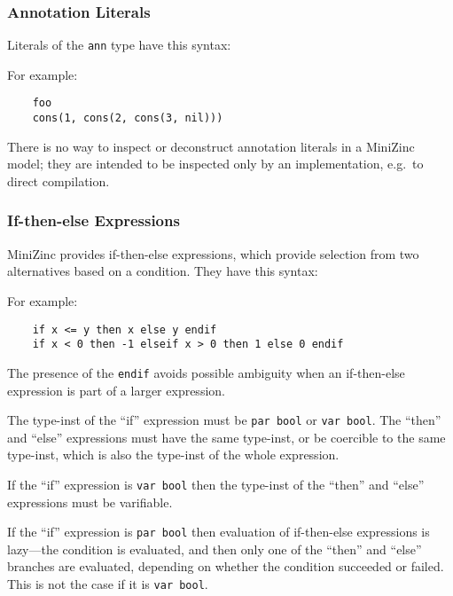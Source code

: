 \documentclass[10pt]{scrartcl}
\begin{document}
\subsubsection{Annotation Literals}
Literals of the \texttt{ann} type have this syntax:
\begin{productions}
    \RuleAnnLiteral
\end{productions}
For example:
\begin{verbatim}
    foo
    cons(1, cons(2, cons(3, nil)))
\end{verbatim}

There is no way to inspect or deconstruct annotation literals in a MiniZinc
model;  they are intended to be inspected only by an implementation, e.g.~to
direct compilation.

\subsubsection{If-then-else Expressions}
MiniZinc provides if-then-else expressions, which provide selection from two
alternatives based on a condition.  They have this syntax:
\begin{productions}
    \RuleIfThenElseExpr
\end{productions}
For example:
\begin{verbatim}
    if x <= y then x else y endif
    if x < 0 then -1 elseif x > 0 then 1 else 0 endif
\end{verbatim}
The presence of the \texttt{endif} avoids possible ambiguity when an
if-then-else expression is part of a larger expression.

The type-inst of the ``if'' expression must be \texttt{par bool} or
\texttt{var bool}.
The ``then'' and
``else'' expressions must have the same type-inst, or be coercible to the
same type-inst, which is also the type-inst of the whole expression.

If the ``if'' expression is \texttt{var bool} then the type-inst of the
``then'' and ``else'' expressions must be varifiable.

If the ``if'' expression is \texttt{par bool} then 
evaluation of if-then-else expressions is lazy---the condition is evaluated,
and then only one of the ``then'' and ``else'' branches are evaluated,
depending on whether the condition succeeded or failed. 
This is not the case if it is \texttt{var bool}.
\end{document}
